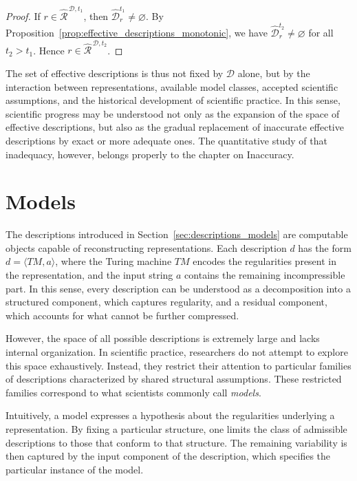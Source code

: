 \begin{proof}
If \(r \in \hat{\mathcal{R}}^{\,\mathcal{D},t_1}\), then \(\hat{\mathcal{D}}_r^{t_1} \neq \varnothing\).
By Proposition~\ref{prop:effective_descriptions_monotonic}, we have
\(\hat{\mathcal{D}}_r^{t_2} \neq \varnothing\) for all \(t_2 > t_1\). Hence
\(r \in \hat{\mathcal{R}}^{\,\mathcal{D},t_2}\).
\end{proof}

The set of effective descriptions is thus not fixed by \(\mathcal{D}\) alone, but by the interaction
between representations, available model classes, accepted scientific assumptions, and the historical
development of scientific practice. In this sense, scientific progress may be understood not only as
the expansion of the space of effective descriptions, but also as the gradual replacement of inaccurate
effective descriptions by exact or more adequate ones. The quantitative study of that inadequacy,
however, belongs properly to the chapter on Inaccuracy.


%
%

\section{Models}
\label{sec:models}

The descriptions introduced in Section~\ref{sec:descriptions_models} are computable objects capable of reconstructing representations. Each description $d$ has the form $d = \langle TM, a \rangle$, where the Turing machine $TM$ encodes the regularities present in the representation, and the input string \(a\) contains the remaining incompressible part. In this sense, every description can be understood as a decomposition into a structured component, which captures regularity, and a residual component, which accounts for what cannot be further compressed.

However, the space of all possible descriptions is extremely large and lacks internal organization. In scientific practice, researchers do not attempt to explore this space exhaustively. Instead, they restrict their attention to particular families of descriptions characterized by shared structural assumptions. These restricted families correspond to what scientists commonly call \emph{models}.

Intuitively, a model expresses a hypothesis about the regularities underlying a representation. By fixing a particular structure, one limits the class of admissible descriptions to those that conform to that structure. The remaining variability is then captured by the input component of the description, which specifies the particular instance of the model.

